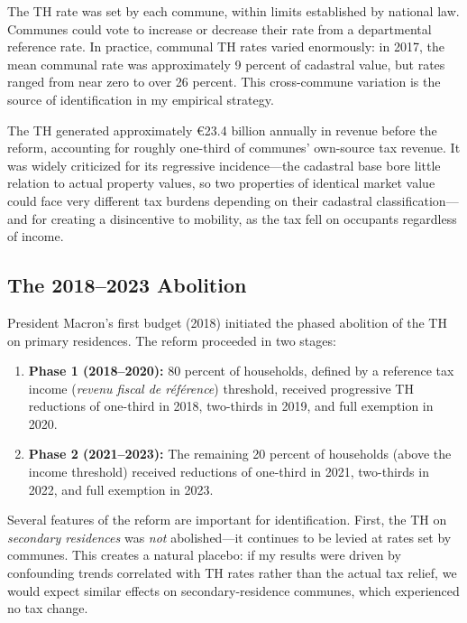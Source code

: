 \documentclass[12pt]{article}
\begin{document}
The TH rate was set by each commune, within limits established by national law. Communes could vote to increase or decrease their rate from a departmental reference rate. In practice, communal TH rates varied enormously: in 2017, the mean communal rate was approximately 9 percent of cadastral value, but rates ranged from near zero to over 26 percent. This cross-commune variation is the source of identification in my empirical strategy.

The TH generated approximately \euro{}23.4 billion annually in revenue before the reform, accounting for roughly one-third of communes' own-source tax revenue. It was widely criticized for its regressive incidence---the cadastral base bore little relation to actual property values, so two properties of identical market value could face very different tax burdens depending on their cadastral classification---and for creating a disincentive to mobility, as the tax fell on occupants regardless of income.

\subsection{The 2018--2023 Abolition}

President Macron's first budget (2018) initiated the phased abolition of the TH on primary residences. The reform proceeded in two stages:

\begin{enumerate}
    \item \textbf{Phase 1 (2018--2020):} 80 percent of households, defined by a reference tax income (\emph{revenu fiscal de r\'{e}f\'{e}rence}) threshold, received progressive TH reductions of one-third in 2018, two-thirds in 2019, and full exemption in 2020.
    \item \textbf{Phase 2 (2021--2023):} The remaining 20 percent of households (above the income threshold) received reductions of one-third in 2021, two-thirds in 2022, and full exemption in 2023.
\end{enumerate}

Several features of the reform are important for identification. First, the TH on \emph{secondary residences} was \emph{not} abolished---it continues to be levied at rates set by communes. This creates a natural placebo: if my results were driven by confounding trends correlated with TH rates rather than the actual tax relief, we would expect similar effects on secondary-residence communes, which experienced no tax change.
\end{document}
